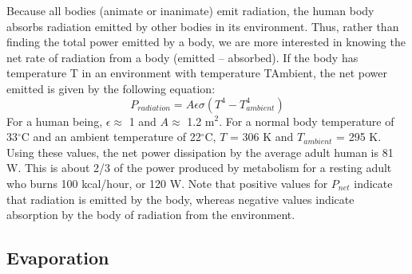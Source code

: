 Because all bodies (animate or inanimate) emit radiation, the human body absorbs radiation emitted by other bodies in its environment.  Thus, rather than finding the total power emitted by a body, we are more interested in knowing the net rate of radiation from a body (emitted – absorbed).  If the body has temperature T in an environment with temperature TAmbient, the net power emitted is given by the following equation:
\begin{equation}\label{eqn4-2}
P_{radiation} = A\epsilon \sigma \left(T^4-T_{ambient}^4\right)
\end{equation}
For a human being, $\epsilon \approx$ 1 and $A \approx$ 1.2 m$^2$.  For a normal body temperature of 33$^{\circ}$C and an ambient temperature of 22$^{\circ}$C, $T$ = 306 K and $T_{ambient}$ = 295 K.  Using these values, the net power dissipation by the average adult human is 81 W.  This is about 2/3 of the power produced by metabolism for a resting adult who burns 100 kcal/hour, or 120 W.  Note that positive values for $P_{net}$ indicate that radiation is emitted by the body, whereas negative values indicate absorption by the body of radiation from the environment.
  
\subsection{Evaporation}

